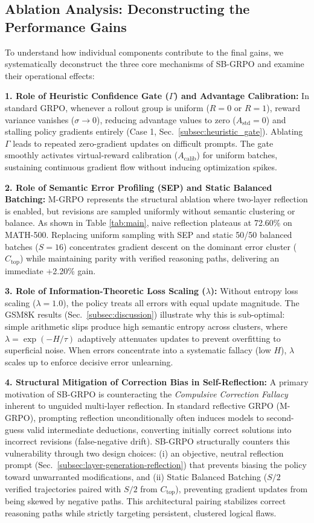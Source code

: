 \subsection{Ablation Analysis: Deconstructing the Performance Gains}
To understand how individual components contribute to the final gains, we systematically deconstruct the three core mechanisms of SB-GRPO and examine their operational effects:

\textbf{1. Role of Heuristic Confidence Gate ($\Gamma$) and Advantage Calibration:} In standard GRPO, whenever a rollout group is uniform ($R=0$ or $R=1$), reward variance vanishes ($\sigma \to 0$), reducing advantage values to zero ($A_{\text{std}}=0$) and stalling policy gradients entirely (Case 1, Sec.~\ref{subsec:heuristic_gate}). Ablating $\Gamma$ leads to repeated zero-gradient updates on difficult prompts. The gate smoothly activates virtual-reward calibration ($A_{\text{calib}}$) for uniform batches, sustaining continuous gradient flow without inducing optimization spikes.

\textbf{2. Role of Semantic Error Profiling (SEP) and Static Balanced Batching:} M-GRPO represents the structural ablation where two-layer reflection is enabled, but revisions are sampled uniformly without semantic clustering or balance. As shown in Table \ref{tab:main}, naive reflection plateaus at 72.60\% on MATH-500. Replacing uniform sampling with SEP and static 50/50 balanced batches ($S=16$) concentrates gradient descent on the dominant error cluster ($C_{\text{top}}$) while maintaining parity with verified reasoning paths, delivering an immediate +2.20\% gain.

\textbf{3. Role of Information-Theoretic Loss Scaling ($\lambda$):} Without entropy loss scaling ($\lambda = 1.0$), the policy treats all errors with equal update magnitude. The GSM8K results (Sec.~\ref{subsec:discussion}) illustrate why this is sub-optimal: simple arithmetic slips produce high semantic entropy across clusters, where $\lambda = \exp(-H/\tau)$ adaptively attenuates updates to prevent overfitting to superficial noise. When errors concentrate into a systematic fallacy (low $H$), $\lambda$ scales up to enforce decisive error unlearning.

\textbf{4. Structural Mitigation of Correction Bias in Self-Reflection:} A primary motivation of SB-GRPO is counteracting the \textit{Compulsive Correction Fallacy} inherent to unguided multi-layer reflection. In standard reflective GRPO (M-GRPO), prompting reflection unconditionally often induces models to second-guess valid intermediate deductions, converting initially correct solutions into incorrect revisions (false-negative drift). SB-GRPO structurally counters this vulnerability through two design choices: (i) an objective, neutral reflection prompt (Sec.~\ref{subsec:layer-generation-reflection}) that prevents biasing the policy toward unwarranted modifications, and (ii) Static Balanced Batching ($S/2$ verified trajectories paired with $S/2$ from $C_{\text{top}}$), preventing gradient updates from being skewed by negative paths. This architectural pairing stabilizes correct reasoning paths while strictly targeting persistent, clustered logical flaws.

